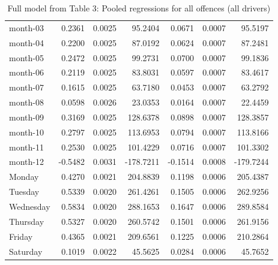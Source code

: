 \documentclass[10pt]{article}
\begin{document}
\begin{table}[ht]
\begin{tabular}{lrrrrrr}
  month-03 & 0.2361 & 0.0025 & 95.2404 & 0.0671 & 0.0007 & 95.5197 \\ 
  month-04 & 0.2200 & 0.0025 & 87.0192 & 0.0624 & 0.0007 & 87.2481 \\ 
  month-05 & 0.2472 & 0.0025 & 99.2731 & 0.0700 & 0.0007 & 99.1836 \\ 
  month-06 & 0.2119 & 0.0025 & 83.8031 & 0.0597 & 0.0007 & 83.4617 \\ 
  month-07 & 0.1615 & 0.0025 & 63.7180 & 0.0453 & 0.0007 & 63.2792 \\ 
  month-08 & 0.0598 & 0.0026 & 23.0353 & 0.0164 & 0.0007 & 22.4459 \\ 
  month-09 & 0.3169 & 0.0025 & 128.6378 & 0.0898 & 0.0007 & 128.3857 \\ 
  month-10 & 0.2797 & 0.0025 & 113.6953 & 0.0794 & 0.0007 & 113.8166 \\ 
  month-11 & 0.2530 & 0.0025 & 101.4229 & 0.0716 & 0.0007 & 101.3302 \\ 
  month-12 & -0.5482 & 0.0031 & -178.7211 & -0.1514 & 0.0008 & -179.7244 \\ 
  Monday & 0.4270 & 0.0021 & 204.8839 & 0.1198 & 0.0006 & 205.4387 \\ 
  Tuesday & 0.5339 & 0.0020 & 261.4261 & 0.1505 & 0.0006 & 262.9256 \\ 
  Wednesday & 0.5834 & 0.0020 & 288.1653 & 0.1647 & 0.0006 & 289.8584 \\ 
  Thursday & 0.5327 & 0.0020 & 260.5742 & 0.1501 & 0.0006 & 261.9156 \\ 
  Friday & 0.4365 & 0.0021 & 209.6561 & 0.1225 & 0.0006 & 210.2864 \\ 
  Saturday & 0.1019 & 0.0022 & 45.5625 & 0.0284 & 0.0006 & 45.7652 \\ 
   \hline
\end{tabular}
\caption{Full model from Table 3: Pooled regressions for all offences (all drivers)} 
\label{tab_3_all_pts_no_age_A}
\end{table}


\clearpage
\pagebreak



\end{document}
